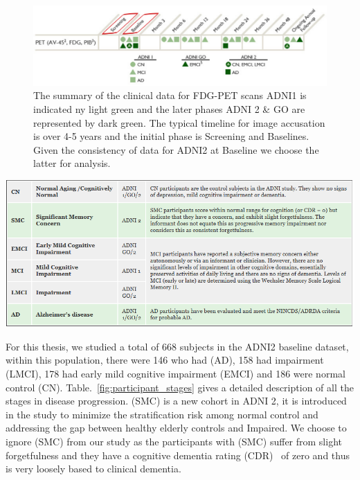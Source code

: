 \begin{figure}
	\centering
	\includegraphics[width=\linewidth]{figures/Imaging_Chart_PET.png}
	\caption[Summary of Clinical Data]{The summary of the clinical data for FDG-PET scans ADNI1 is indicated ny light green and the later phases ADNI 2 \& GO are represented by dark green. The typical timeline for image accusation is over 4-5 years and the initial phase is Screening and Baselines. Given the consistency of data for ADNI2 at Baseline we choose the latter for analysis.}
	\label{fig:study_schedule}
\end{figure}
 

\begin{table}
	\centering
	\includegraphics[width=\linewidth]{figures/participant_stages.png}
	\caption[Participant Stages across ADNI 1/GO/2.]{Participant Stages across ADNI 1/GO/2.\footnote{http://adni.loni.usc.edu/study-design/background-rationale/}}
	\label{fig:participant_stages}
\end{table}
  
For this thesis, we studied a total of 668 subjects in the ADNI2 baseline dataset, within this population, there were 146 who had \Alzheimers (AD), 158 had impairment (LMCI), 178 had early mild cognitive impairment (EMCI) and 186 were normal control (CN). Table.~\ref{fig:participant_stages} gives a detailed description of all the stages in disease progression. (SMC) is a new cohort in ADNI 2, it is introduced in the study to minimize the stratification risk among normal control and addressing the gap between healthy elderly controls and Impaired. We choose to ignore (SMC) from our study as the participants with (SMC) suffer from slight forgetfulness and they have a cognitive dementia rating (CDR)~\citep{morris1993clinical} of zero and thus is very loosely based to clinical dementia. 

